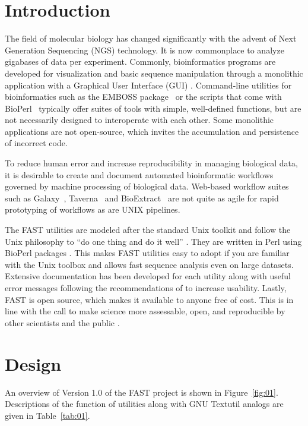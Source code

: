 \documentclass{frontiersSCNS} %
\begin{document}
\section{Introduction}

The field of molecular biology has changed significantly with the
advent of Next Generation Sequencing (NGS) technology. It is now
commonplace to analyze gigabases of data per experiment. Commonly,
bioinformatics programs are developed for visualization and basic
sequence manipulation through a monolithic application with a
Graphical User Interface (GUI) \citep{Smith1994, Rampp2006,
  Librado01062009}. Command-line utilities for bioinformatics such as
the EMBOSS package~\citep{Rice2000} or the scripts that come with
BioPerl~\citep{Stajich2002} typically offer suites of tools with
simple, well-defined functions, but are not necessarily designed to
interoperate with each other. Some monolithic applications are not
open-source, which invites the accumulation and persistence of
incorrect code.

To reduce human error and increase reproducibility in managing
biological data, it is desirable to create and document automated
bioinformatic workflows governed by machine processing of biological
data. Web-based workflow suites such as Galaxy~\citep{galaxy},
Taverna~\citep{CPE:CPE993} and BioExtract~\citep{Lushbough01072011}
are not quite as agile for rapid prototyping of workflows as are UNIX
pipelines.

The FAST utilities are modeled after the standard Unix
toolkit\citep{Peek2001} and follow the Unix philosophy to ``do one
thing and do it well'' \citep{Stutz2000}. They are written in Perl
using BioPerl packages \citep{Stajich2002}. This makes FAST utilities
easy to adopt if you are familiar with the Unix toolbox and allows
fast sequence analysis even on large datasets. Extensive
documentation has been developed for each utility along with useful
error messages following the recommendations of \cite{Seemann2013} to
increase usability. Lastly, FAST is open source, which makes it
available to anyone free of cost. This is in line with the call to
make science more assessable, open, and reproducible by other
scientists and the public \citep{Groves2012}.

\section{Design}

An overview of Version 1.0 of the FAST project is shown in
Figure~\ref{fig:01}. Descriptions of the function of utilities along
with GNU Textutil analogs are given in Table~\ref{tab:01}.
\end{document}
